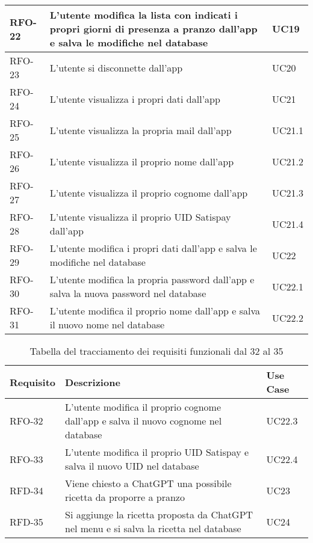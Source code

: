 \begin{table}
\begin{tabularx}{\textwidth}{lXl}
\hline
RFO-22    & L'utente modifica la lista con indicati i propri giorni di presenza a pranzo dall'app e salva le modifiche nel database & UC19 \\
\hline
RFO-23    & L'utente si disconnette dall'app & UC20 \\
\hline
RFO-24    & L'utente visualizza i propri dati dall'app & UC21 \\
\hline
RFO-25    & L'utente visualizza la propria mail dall'app & UC21.1 \\
\hline
RFO-26    & L'utente visualizza il proprio nome dall'app & UC21.2 \\
\hline
RFO-27    & L'utente visualizza il proprio cognome dall'app & UC21.3 \\
\hline
RFO-28    & L'utente visualizza il proprio UID Satispay dall'app & UC21.4 \\
\hline
RFO-29    & L'utente modifica i propri dati dall'app e salva le modifiche nel database & UC22 \\
\hline
RFO-30    & L'utente modifica la propria password dall'app e salva la nuova password nel database & UC22.1 \\
\hline
RFO-31    & L'utente modifica il proprio nome dall'app e salva il nuovo nome nel database & UC22.2 \\
\hline
\end{tabularx}
\end{table}%

\newpage

\begin{table}[htb]%
\caption{Tabella del tracciamento dei requisiti funzionali dal 32 al 35}
\label{tab:requisiti-funzionalitre}
\begin{tabularx}{\textwidth}{lXl}
\hline
\textbf{Requisito} & \textbf{Descrizione} & \textbf{Use Case}\\
\hline\hline
RFO-32    & L'utente modifica il proprio cognome dall'app e salva il nuovo cognome nel database & UC22.3 \\
\hline
RFO-33    & L'utente modifica il proprio UID Satispay e salva il nuovo UID nel database & UC22.4 \\
\hline
RFD-34    & Viene chiesto a ChatGPT una possibile ricetta da proporre a pranzo & UC23 \\
\hline
RFD-35    & Si aggiunge la ricetta proposta da ChatGPT nel menu e si salva la ricetta nel database & UC24 \\
\hline
\end{tabularx}
\end{table}%


